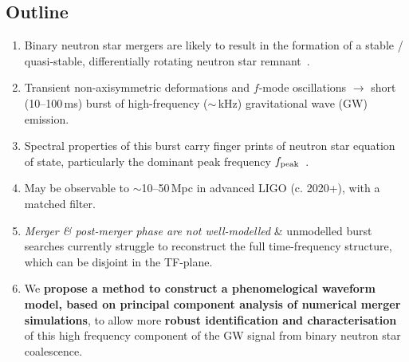 \documentclass[a0,landscape]{a0poster}
\def\gw#1{gravitational wave#1 (GW#1)\gdef\gw{GW}}
\begin{document}
\begin{multicols}{4}

\color{DarkSlateGray} %

\section*{\centering Outline}

\begin{enumerate}
\item Binary neutron star mergers are likely to result in the formation of a
    stable / quasi-stable, differentially rotating neutron star
    remnant~\cite{shibata:06bns, giacomazzo:11, hotokezaka:11, bauswein:12}.
\item Transient non-axisymmetric deformations and $f$-mode oscillations
    $\rightarrow$ short (10--100\,ms) burst of high-frequency ($\sim $\,kHz)
    \gw{} emission.
\item Spectral properties of this burst carry finger prints of neutron star
    equation of state, particularly the dominant peak frequency $f_{\rm
    peak}$~\cite{hotokezaka:13,bauswein:14}.
\item May be observable to $\sim$10--50\,Mpc in advanced LIGO (c. 2020+), with a matched filter.
\item \emph{Merger \& post-merger phase are not well-modelled} \& unmodelled
    burst searches currently struggle to reconstruct the full time-frequency
    structure, which can be disjoint in the TF-plane.
\item We {\bf propose a method to construct a phenomelogical waveform model,
    based on principal component analysis of numerical merger simulations},
    to allow more {\bf robust identification and characterisation} of this
    high frequency component of the \gw{} signal from binary neutron star coalescence.
\end{enumerate}



\end{multicols}
\end{document}
